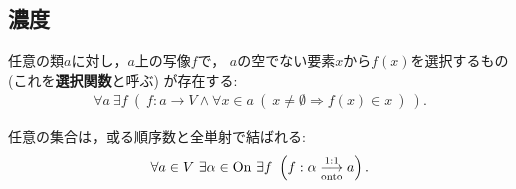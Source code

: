 \subsection{濃度}
	\begin{screen}
		\begin{axm}[選択公理]
			任意の類$a$に対し，$a$上の写像$f$で，
			$a$の空でない要素$x$から$f(x)$を選択するもの
			(これを{\bf 選択関数}と呼ぶ)
			が存在する:
			\begin{align}
				\forall a\ \exists f\ \left(\ 
				f:a \longrightarrow V \wedge \forall x \in a\ 
				(\ x \neq \emptyset \Longrightarrow f(x) \in x\ )\ \right). 
			\end{align}
		\end{axm}
	\end{screen}
	
	\begin{screen}
		\begin{thm}[整列可能定理]
			任意の集合は，或る順序数と全単射で結ばれる:
			\begin{align}
				\forall a \in V\ \exists \alpha \in \ON\ 
				\exists f\ \left( f:\alpha \bij a \right).
			\end{align}
		\end{thm}
	\end{screen}
	
	\begin{screen}
		\begin{dfn}[有限・可算・無限]
			
		\end{dfn}
	\end{screen}